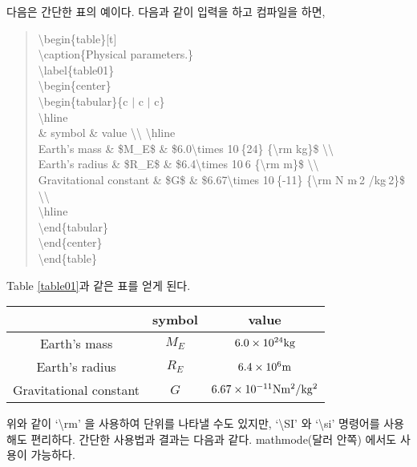 \documentclass{gshs-report-v1.2}
\begin{document}
다음은 간단한 표의 예이다. 다음과 같이 입력을 하고 컴파일을 하면,
\begin{quote}
	{\textbackslash}begin\{table\}[t]\\
	{\textbackslash}caption\{Physical parameters.\}\\
	{\textbackslash}label\{table01\}\\
	{\textbackslash}begin\{center\}\\
	{\textbackslash}begin\{tabular\}\{c $|$ c $|$ c\}\\
	{\textbackslash}hline\\
	\& symbol \& value {\textbackslash}{\textbackslash} {\textbackslash}hline \\
	Earth's mass \& \$M\_E\$ \& \$6.0{\textbackslash}times 10$\hat{\ }$\{24\} \{{\textbackslash}rm kg\}\$ {\textbackslash}{\textbackslash}\\
	Earth's radius \& \$R\_E\$ \& \$6.4{\textbackslash}times 10$\hat{\ }$6 \{{\textbackslash}rm m\}\$ {\textbackslash}{\textbackslash}\\
	Gravitational constant \& \$G\$ \& \$6.67{\textbackslash}times 10$\hat{\ }$\{-11\} \{{\textbackslash}rm N m$\hat{\ }$2 /kg$\hat{\ }$2\}\$ {\textbackslash}{\textbackslash} \\
	{\textbackslash}hline\\
	{\textbackslash}end\{tabular\}\\
	{\textbackslash}end\{center\}\\
	{\textbackslash}end\{table\}
\end{quote}
Table \ref{table01}과 같은 표를 얻게 된다.
\begin{table}[t]
	\begin{center}
		\begin{tabular}{c|c|c}
			\hline
			& symbol & value \\ \hline
			Earth's mass & $M_E$ & $6.0\times 10^{24} {\rm kg}$ \\
			Earth's radius & $R_E$ & $6.4\times 10^6 {\rm m}$ \\
			Gravitational constant & $G$ & $6.67\times 10^{-11} {\rm N m^2 /kg^2}$ \\ \hline
		\end{tabular}
	\end{center}
\end{table}

위와 같이 `\textbackslash rm' 을 사용하여 단위를 나타낼 수도 있지만,
`\textbackslash SI' 와 `\textbackslash si' 명령어를 사용해도 편리하다. 
간단한 사용법과 결과는 다음과 같다. mathmode(달러 안쪽) 에서도 사용이 가능하다.
\end{document}
